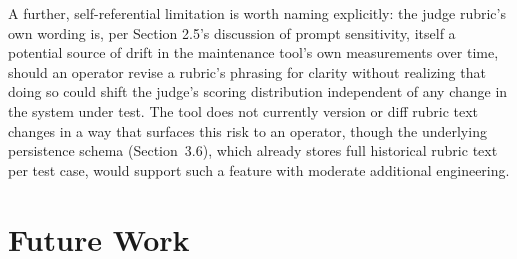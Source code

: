 \documentclass[11pt,a4paper]{article}
\begin{document}
A further, self-referential limitation is worth naming explicitly: the
judge rubric's own wording is, per Section
2.5's discussion of prompt sensitivity, itself a
potential source of drift in the maintenance tool's own
measurements over time, should an operator revise a
rubric's phrasing for clarity without realizing that
doing so could shift the judge's scoring distribution
independent of any change in the system under test. The tool does not
currently version or diff rubric text changes in a way that surfaces
this risk to an operator, though the underlying persistence schema
(Section~3.6), which already stores full historical rubric text per test
case, would support such a feature with moderate additional engineering.

\section{Future Work}
\end{document}
